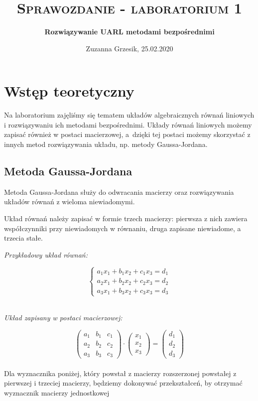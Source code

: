 \documentclass{article}
\title{\textsc{Sprawozdanie - laboratorium 1}}
\date{Zuzanna Grzesik, 25.02.2020}
\author{\Large{\textbf{Rozwiązywanie UARL metodami bezpośrednimi}}}
\begin{document}
\maketitle

	
\section{Wstęp teoretyczny}	
\par	
Na laboratorium zajęliśmy się tematem układów algebraicznych równań liniowych i rozwiązywaniu ich metodami bezpośrednimi. 
Układy równań liniowych możemy zapisać również w postaci macierzowej, a~dzięki tej postaci możemy skorzystać z innych metod rozwiązywania układu, np. metody Gaussa-Jordana.
\subsection{Metoda Gaussa-Jordana}
Metoda Gaussa-Jordana służy do odwracania macierzy oraz rozwiązywania układów równań z wieloma niewiadomymi.  
\par
Układ równań należy zapisać w formie trzech macierzy: pierwsza z nich zawiera współczynniki przy niewiadomych w równaniu, druga zapisane niewiadome, a trzecia stałe. 

\begin{center}\textit{Przykładowy układ równań:}
\end{center}

\begin{equation}
\begin{cases}
	a_1x_1 + b_1x_2+c_1x_3=d_1 \\
	a_2x_1 + b_2x_2+c_2x_3=d_2 \\
	a_3x_1 + b_3x_2+c_3x_3=d_3
\end{cases}
\end{equation}
\\

\begin{center}\textit{Układ zapisany w postaci macierzowej:}
\end{center}

\begin{equation}
	\begin{pmatrix}
	a_1 & b_1 & c_1 \\
	a_2 & b_2 & c_2 \\
	a_3 & b_3 & c_3
	\end{pmatrix}
	\cdot
	\begin{pmatrix}
	x_1 \\
	x_2 \\
	x_3
	\end{pmatrix}
	=
	\begin{pmatrix}
	d_1 \\
	d_2 \\
	d_3
	\end{pmatrix}
\end{equation}
\\
Dla wyznacznika poniżej, który powstał z macierzy rozszerzonej powstałej z pierwszej i trzeciej macierzy, będziemy dokonywać przekształceń, by otrzymać wyznacznik macierzy jednostkowej
\end{document}
